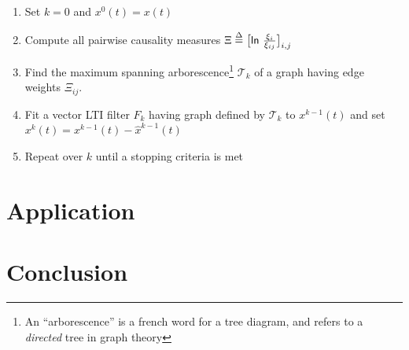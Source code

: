 \documentclass[12pt]{article}
\begin{document}

\begin{enumerate}
  \item{Set $k = 0$ and $x^0(t) = x(t)$}
  \item{Compute all pairwise causality measures $\Xi \overset{\Delta}{=} \big[\mathsf{ln\ } \frac{\xi_i}{\xi_{ij}} \big]_{i, j}$}
  \item{Find the maximum spanning arborescence\footnote{An ``arborescence'' is a french word for a tree diagram, and refers to a \textit{directed} tree in graph theory} $\mathcal{T}_k$ of a graph having edge weights $\Xi_{ij}$.}
  \item{Fit a vector LTI filter $F_k$ having graph defined by $\mathcal{T}_k$ to $x^{k - 1}(t)$ and set $x^k(t) = x^{k - 1}(t) - \hat{x}^{k - 1}(t)$}
  \item{Repeat over $k$ until a stopping criteria is met}
\end{enumerate}


\section{Application}
\section{Conclusion}

\printbibliography
\end{document}
